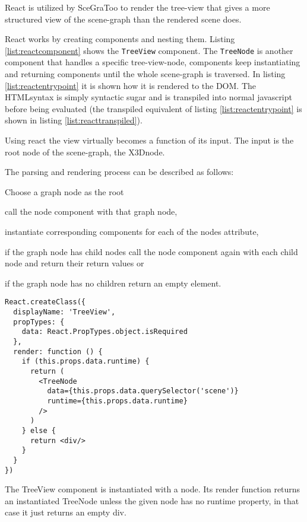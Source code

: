 React is utilized by SceGraToo to render the tree-view that gives a more
structured view of the scene-graph than the rendered scene does.

React works by creating components and nesting them. Listing
\ref{list:reactcomponent} shows the \texttt{TreeView} component. The
\texttt{TreeNode} is another component that handles a specific tree-view-node,
components keep instantiating and returning components until the whole
scene-graph is traversed. In listing \ref{list:reactentrypoint} it is shown how
it is rendered to the DOM. The \gls{HTML}syntax is simply syntactic sugar and is
transpiled into normal javascript before being evaluated (the transpiled
equivalent of listing \ref{list:reactentrypoint} is shown in listing
\ref{list:reacttranspiled}).

Using react the view virtually becomes a function of its input. The input is the root node of the scene-graph, the \gls{X3D}node.

The parsing and rendering process can be described as follows:
\begin{enumerate*}
  \item Choose a graph node as the root
  \item call the node component with that graph node,
  \item instantiate corresponding components for each of the nodes attribute,
  \item if the graph node has child nodes call the node component again with each child node and return their return values or
  \item if the graph node has no children return an empty element.
\end{enumerate*}

\begin{listing}
  \begin{verbatim}
React.createClass({
  displayName: 'TreeView',
  propTypes: {
    data: React.PropTypes.object.isRequired
  },
  render: function () {
    if (this.props.data.runtime) {
      return (
        <TreeNode
          data={this.props.data.querySelector('scene')}
          runtime={this.props.data.runtime}
        />
      )
    } else {
      return <div/>
    }
  }
})
  \end{verbatim}
  \caption{The TreeView component is instantiated with a node. Its render function returns an instantiated TreeNode unless the given node has no runtime property, in that case it just returns an empty div.}
  \label{list:reactcomponent}
\end{listing}

